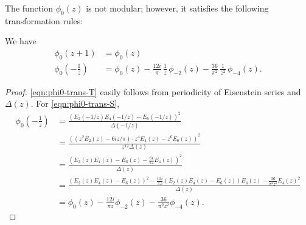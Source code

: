 The function $\phi_0(z)$ is not modular; however, it satisfies the following transformation rules:

\begin{lemma}\label{lemma:phi0-transform}\leanok
We have
\begin{align}
    \phi_0(z + 1) &= \phi_0(z) \label{eqn:phi0-trans-T} \\
    \phi_0\left(-\frac{1}{z}\right) &= \phi_0(z)-\frac{12i}{\pi}\,\frac{1}{z}\,\phi_{-2}(z)-\frac{36}{\pi^2}\,\frac{1}{z^2}\,\phi_{-4}(z).\label{eqn:phi0-trans-S}
\end{align}
\end{lemma}
\begin{proof}\leanok
\eqref{eqn:phi0-trans-T} easily follows from periodicity of Eisenstein series and $\Delta(z)$.
For \eqref{eqn:phi0-trans-S},
\begin{align}
    \phi_{0}\left(-\frac{1}{z}\right) &= \frac{(E_2(-1/z) E_4(-1/z) - E_6(-1/z))^{2}}{\Delta(-1/z)} \\
    &= \frac{((z^2 E_2(z) - 6iz / \pi) \cdot z^4 E_4(z) - z^6 E_6(z))^{2}}{z^{12} \Delta(z)} \\
    &= \frac{\left(E_2(z) E_4(z) - E_6(z) - \frac{6i}{\pi z} E_4(z)\right)^2}{\Delta(z)} \\
    &= \frac{(E_2(z) E_4(z) - E_6(z))^{2} - \frac{12i}{\pi z}(E_2(z) E_4(z) - E_6(z)) E_4(z) - \frac{36}{\pi^2 z^2} E_4(z)^{2}}{\Delta(z)} \\
    &= \phi_0(z) - \frac{12 i}{\pi z} \phi_{-2}(z) - \frac{36}{\pi^2 z^2} \phi_{-4}(z).
\end{align}
\end{proof}

